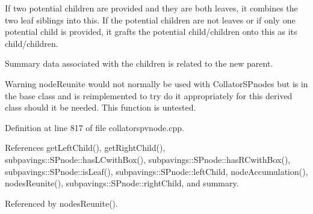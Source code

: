 \-If two potential children are provided and they are both leaves, it combines the two leaf siblings into this. \-If the potential children are not leaves or if only one potential child is provided, it grafts the potential child/children onto this as its child/children.

\-Summary data associated with the children is related to the new parent.

\begin{DoxyWarning}{\-Warning}
node\-Reunite would not normally be used with \-Collator\-S\-Pnodes but is in the base class and is reimplemented to try do it appropriately for this derived class should it be needed. \-This function is untested. 
\end{DoxyWarning}


\-Definition at line 817 of file collatorspvnode.\-cpp.



\-References get\-Left\-Child(), get\-Right\-Child(), subpavings\-::\-S\-Pnode\-::has\-L\-Cwith\-Box(), subpavings\-::\-S\-Pnode\-::has\-R\-Cwith\-Box(), subpavings\-::\-S\-Pnode\-::is\-Leaf(), subpavings\-::\-S\-Pnode\-::left\-Child, node\-Accumulation(), nodes\-Reunite(), subpavings\-::\-S\-Pnode\-::right\-Child, and summary.



\-Referenced by nodes\-Reunite().



